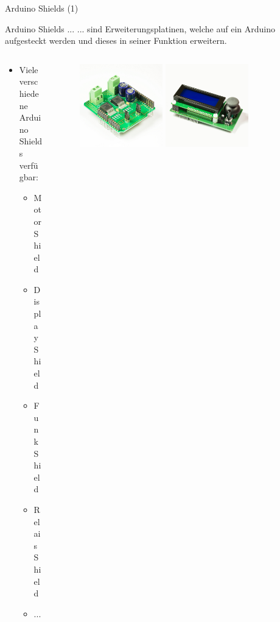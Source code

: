 \documentclass{beamer}
\begin{document}
\begin{frame}{Arduino Shields (1)}
\begin{alertblock}{Arduino Shields ...}
... sind Erweiterungsplatinen, welche auf ein Arduino aufgesteckt werden und dieses in seiner Funktion erweitern.
\end{alertblock}
\begin{columns}
	\begin{column}{0.5\textwidth}
	\begin{itemize}
		\item Viele verschiedene Arduino Shields verf\"ugbar:
		\begin{itemize}
			\item Motor Shield
			\item Display Shield
			\item Funk Shield
			\item Relais Shield
			\item ...
		\end{itemize}
	\end{itemize}
	\end{column}
	\begin{column}{0.5\textwidth}
		\begin{figure}
			\centering
			\includegraphics[width=0.4\textwidth]{./images/highpower-motorshield.jpg}
			\includegraphics[width=0.4\textwidth]{./images/display-shield.jpg}\\

\end{figure}
\end{column}
\end{columns}
\end{frame}
\end{document}
